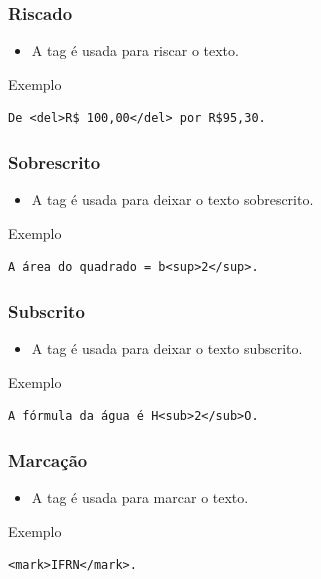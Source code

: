 \documentclass[aspectratio=169]{beamer} %
\begin{document}
\begin{frame}[fragile]
	\frametitle{Riscado}
	
	\begin{itemize}
		\item A tag  é usada para riscar o texto.
	\end{itemize}\vfill
	
	\begin{exampleblock}{Exemplo}
		\begin{lstlisting}
De <del>R$ 100,00</del> por R$95,30.
		\end{lstlisting}
	\end{exampleblock}
\end{frame}

\begin{frame}[fragile]
	\frametitle{Sobrescrito}
	
	\begin{itemize}
		\item A tag  é usada para deixar o texto sobrescrito.
	\end{itemize}\vfill
	
	\begin{exampleblock}{Exemplo}
		\begin{lstlisting}
A área do quadrado = b<sup>2</sup>.
		\end{lstlisting}
	\end{exampleblock}
\end{frame}

\begin{frame}[fragile]
	\frametitle{Subscrito}
	
	\begin{itemize}
		\item A tag  é usada para deixar o texto subscrito.
	\end{itemize}\vfill
	
	\begin{exampleblock}{Exemplo}
		\begin{lstlisting}
A fórmula da água é H<sub>2</sub>O.
		\end{lstlisting}
	\end{exampleblock}
\end{frame}

\begin{frame}[fragile]
	\frametitle{Marcação}
	
	\begin{itemize}
		\item A tag  é usada para marcar o texto.
	\end{itemize}\vfill
	
	\begin{exampleblock}{Exemplo}
		\begin{lstlisting}
<mark>IFRN</mark>.
		\end{lstlisting}
	\end{exampleblock}
\end{frame}
\end{document}
